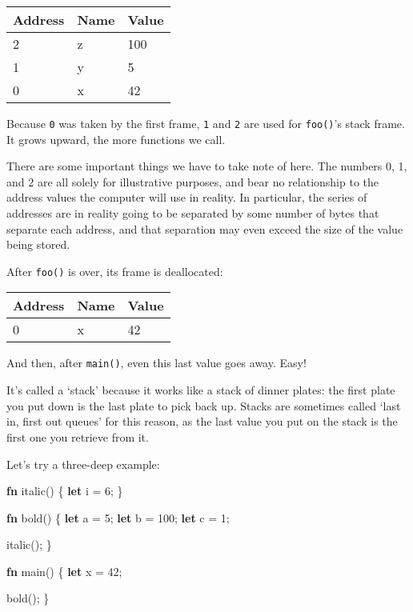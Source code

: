 \documentclass[a4paper,]{book}
\newenvironment{Shaded}{\begin{snugshade}}{\end{snugshade}}
\newcommand{\KeywordTok}[1]{\textcolor[rgb]{0.13,0.29,0.53}{\textbf{{#1}}}}
\newcommand{\DecValTok}[1]{\textcolor[rgb]{0.00,0.00,0.81}{{#1}}}
\newcommand{\NormalTok}[1]{{#1}}
\begin{document}
\begin{longtable}[c]{@{}lll@{}}
\toprule
Address & Name & Value\tabularnewline
\midrule
\endhead
2 & z & 100\tabularnewline
1 & y & 5\tabularnewline
0 & x & 42\tabularnewline
\bottomrule
\end{longtable}

Because \texttt{0} was taken by the first frame, \texttt{1} and
\texttt{2} are used for \texttt{foo()}'s stack frame. It grows upward,
the more functions we call.

There are some important things we have to take note of here. The
numbers 0, 1, and 2 are all solely for illustrative purposes, and bear
no relationship to the address values the computer will use in reality.
In particular, the series of addresses are in reality going to be
separated by some number of bytes that separate each address, and that
separation may even exceed the size of the value being stored.

After \texttt{foo()} is over, its frame is deallocated:

\begin{longtable}[c]{@{}lll@{}}
\toprule
Address & Name & Value\tabularnewline
\midrule
\endhead
0 & x & 42\tabularnewline
\bottomrule
\end{longtable}

And then, after \texttt{main()}, even this last value goes away. Easy!

It's called a `stack' because it works like a stack of dinner plates:
the first plate you put down is the last plate to pick back up. Stacks
are sometimes called `last in, first out queues' for this reason, as the
last value you put on the stack is the first one you retrieve from it.

Let's try a three-deep example:

\begin{Shaded}
\begin{Highlighting}[]
\KeywordTok{fn} \NormalTok{italic() \{}
    \KeywordTok{let} \NormalTok{i = }\DecValTok{6}\NormalTok{;}
\NormalTok{\}}

\KeywordTok{fn} \NormalTok{bold() \{}
    \KeywordTok{let} \NormalTok{a = }\DecValTok{5}\NormalTok{;}
    \KeywordTok{let} \NormalTok{b = }\DecValTok{100}\NormalTok{;}
    \KeywordTok{let} \NormalTok{c = }\DecValTok{1}\NormalTok{;}

    \NormalTok{italic();}
\NormalTok{\}}

\KeywordTok{fn} \NormalTok{main() \{}
    \KeywordTok{let} \NormalTok{x = }\DecValTok{42}\NormalTok{;}

    \NormalTok{bold();}
\NormalTok{\}}
\end{Highlighting}
\end{Shaded}
\end{document}

